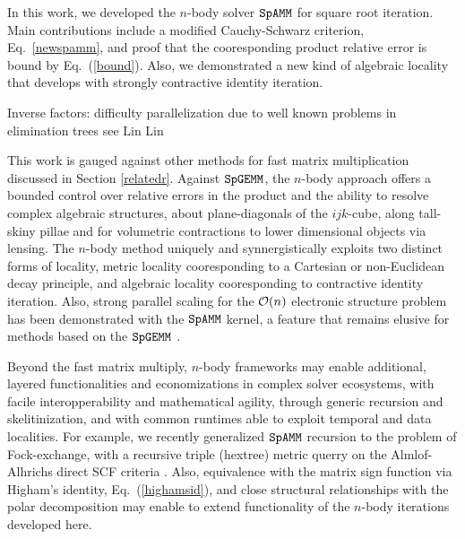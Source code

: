 \documentclass[letterpaper,twocolumn,amsmath,amsfont,amssymb,english,aps,jcp,preprintnumbers,groupaddress,nofootinbib,tightenlines,floatfix]{revtex4}
\theoremstyle{plain}
\theoremstyle{remark}
\theoremstyle{plain}
\begin{document}
In this work, we developed the $n$-body solver $\tt SpAMM$ for square root iteration.   
Main contributions include a modified Cauchy-Schwarz criterion, Eq.~\ref{newspamm}, and proof that the 
cooresponding product relative error is bound by Eq.~(\ref{bound}).  Also, we demonstrated a new kind of 
algebraic locality that develops with strongly contractive identity iteration.

Inverse factors: difficulty parallelization due to well known problems in elimination trees see Lin Lin


This work is gauged against other methods for fast matrix multiplication discussed in Section \ref{relatedr}. 
Against $\tt SpGEMM$, the $n$-body approach offers a bounded control over relative errors in 
the product and the ability to resolve complex algebraic structures, about plane-diagonals of the $ijk$-cube, 
along tall-skiny pillae and for volumetric contractions to lower dimensional objects via lensing. 
The $n$-body method uniquely and synnergistically exploits two distinct forms of locality, metric locality cooresponding to 
a Cartesian or non-Euclidean decay principle, and algebraic locality cooresponding to contractive identity iteration. 
Also, strong parallel scaling for the ${\cal{O}}(n)$ electronic structure problem has been demonstrated with the $\tt SpAMM$ kernel, 
a feature that remains elusive for methods based on the $\tt SpGEMM$ \cite{Bowler2014:comment}.


Beyond the fast matrix multiply, $n$-body frameworks may enable additional, layered functionalities and economizations 
in complex solver ecosystems, with facile interopperability and mathematical agility, 
through generic recursion and skelitinization, and with common runtimes able to exploit temporal and data localities.
For example, we recently generalized $\tt SpAMM$ recursion to the problem of Fock-exchange, with a recursive triple (hextree) 
metric querry on the Almlof-Alhrichs direct SCF criteria \cite{challacombe2014n}.  
Also, equivalence with the matrix sign function via Higham's identity, Eq.~(\ref{highamsid}), and close structural relationships with the 
polar decomposition \cite{higham2005} may enable to extend functionality of the $n$-body iterations developed here. 
\end{document}
